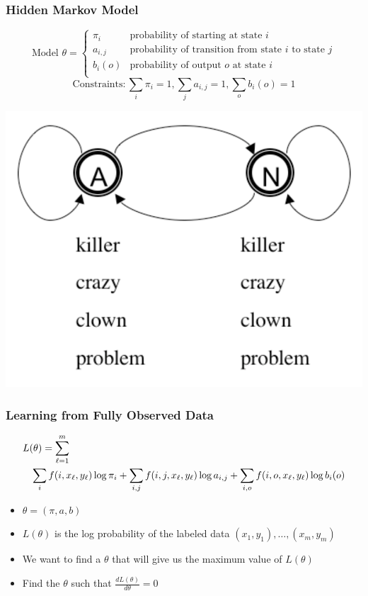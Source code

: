 \begin{frame}
\frametitle{Hidden Markov Model}
\[
\textrm{Model $\theta$} = \left\{ 
\begin{array}{ll} 
\pi_i & \textrm{probability of starting at state $i$} \\ 
a_{i,j} & \textrm{probability of transition from state $i$ to state $j$} \\ 
b_i(o) & \textrm{probability of output $o$ at state $i$} \\
\end{array} 
\right. 
\]
\[
\textrm{Constraints}: \sum_i \pi_i = 1, \sum_j a_{i,j} = 1, \sum_o b_i(o) = 1
\]

\begin{center}
\includegraphics[scale=.4]{figures/hmmfig}
\end{center}
\end{frame}

\begin{frame}
\frametitle{Learning from Fully Observed Data}
{\small\begin{eqnarray*}
\lefteqn{L(\theta) = \sum_{\ell=1}^m  } \\
&& \sum_{i} f(i,x_\ell,y_\ell) \log \pi_i + \sum_{i,j} f(i,j,x_\ell,y_\ell) \log a_{i,j} + \sum_{i,o} f(i,o,x_\ell,y_\ell) \log b_i(o) \end{eqnarray*}}
\begin{itemize}[<+->]
\item $\theta = \left( \pi, a, b \right)$
\item $L(\theta)$ is the log probability of the labeled data $(x_1, y_1), \ldots, (x_m, y_m)$ 
\item We want to find a $\theta$ that will give us the maximum value of $L(\theta)$
\item Find the $\theta$ such that $\frac{d L(\theta)}{d \theta} = 0$ 
\end{itemize}
\end{frame}


